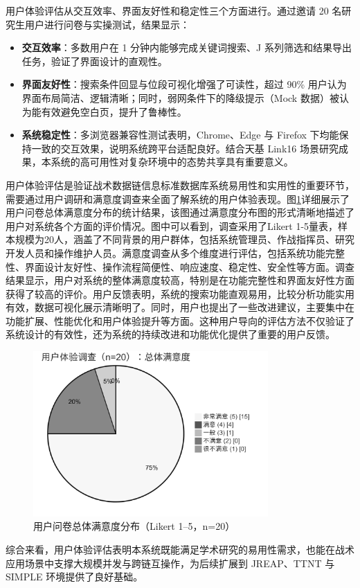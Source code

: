 用户体验评估从交互效率、界面友好性和稳定性三个方面进行。通过邀请 20 名研究生用户进行问卷与实操测试，结果显示：

\begin{itemize}
  \item \textbf{交互效率}：多数用户在 1 分钟内能够完成关键词搜索、J 系列筛选和结果导出任务，验证了界面设计的直观性。
  \item \textbf{界面友好性}：搜索条件回显与位段可视化增强了可读性，超过 90\% 用户认为界面布局简洁、逻辑清晰；同时，弱网条件下的降级提示（Mock 数据）被认为能有效避免空白页，提升了鲁棒性。
  \item \textbf{系统稳定性}：多浏览器兼容性测试表明，Chrome、Edge 与 Firefox 下均能保持一致的交互效果，说明系统跨平台适配良好。结合天基 Link16 场景研究成果，本系统的高可用性对复杂环境中的态势共享具有重要意义。
\end{itemize}

用户体验评估是验证战术数据链信息标准数据库系统易用性和实用性的重要环节，需要通过用户调研和满意度调查来全面了解系统的用户体验表现。图\ref{fig:survey-satisfaction}详细展示了用户问卷总体满意度分布的统计结果，该图通过满意度分布图的形式清晰地描述了用户对系统各个方面的评价情况。图中可以看到，调查采用了Likert 1-5量表，样本规模为20人，涵盖了不同背景的用户群体，包括系统管理员、作战指挥员、研究开发人员和操作维护人员。满意度调查从多个维度进行评估，包括系统功能完整性、界面设计友好性、操作流程简便性、响应速度、稳定性、安全性等方面。调查结果显示，用户对系统的整体满意度较高，特别是在功能完整性和界面友好性方面获得了较高的评价。用户反馈表明，系统的搜索功能直观易用，比较分析功能实用有效，数据可视化展示清晰明了。同时，用户也提出了一些改进建议，主要集中在功能扩展、性能优化和用户体验提升等方面。这种用户导向的评估方法不仅验证了系统设计的有效性，还为系统的持续改进和功能优化提供了重要的用户反馈。

\begin{figure}[H]
  \centering
  \includegraphics[width=0.8\textwidth]{chapters/fig-0/survey-satisfaction.png}
  \caption{用户问卷总体满意度分布（Likert 1--5，n=20）}
  \label{fig:survey-satisfaction}
\end{figure}
综合来看，用户体验评估表明本系统既能满足学术研究的易用性需求，也能在战术应用场景中支撑大规模并发与跨链互操作，为后续扩展到 JREAP、TTNT 与 SIMPLE 环境提供了良好基础。
